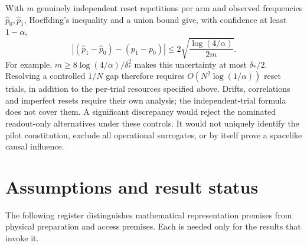 \documentclass[11pt,a4paper]{article}
\theoremstyle{definition}
\theoremstyle{remark}\newtheorem{remark}[theorem]{Remark}
\begin{document}
With $m$ genuinely independent reset repetitions per arm and observed
frequencies $\widehat p_0,\widehat p_1$, Hoeffding's inequality and a
union bound give, with confidence at least $1-\alpha$,
\[
 |(\widehat p_1-\widehat p_0)-(p_1-p_0)|
 \le 2\sqrt{\frac{\log(4/\alpha)}{2m}}.
\]
For example, $m\ge8\log(4/\alpha)/\delta_*^2$ makes this uncertainty at
most $\delta_*/2$. Resolving a controlled $1/N$ gap therefore requires
$O(N^2\log(1/\alpha))$ reset trials, in addition to the per-trial
resources specified above. Drifts, correlations and imperfect resets
require their own analysis; the independent-trial formula does not
cover them. A significant discrepancy would reject the nominated
readout-only alternatives under these controls. It would not uniquely
identify the pilot constitution, exclude all operational surrogates, or
by itself prove a spacelike causal influence.

\section{Assumptions and result status}
\label{reg:section}
The following register distinguishes mathematical representation premises
from physical preparation and access premises. Each is needed only for
the results that invoke it.
\end{document}
